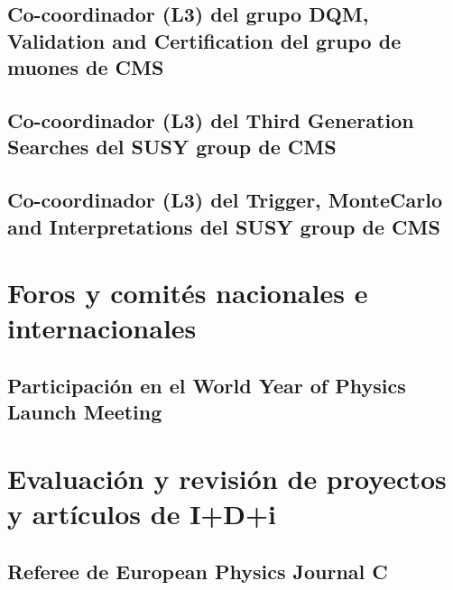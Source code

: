 \documentclass[a4paper, 11pt, twoside, openright]{report}
\begin{document}
\subsection{Co-coordinador (L3) del grupo DQM, Validation and Certification del grupo de muones de CMS}


\subsection{Co-coordinador (L3) del Third Generation Searches del SUSY group de CMS}


\subsection{Co-coordinador (L3) del Trigger, MonteCarlo and Interpretations del SUSY group de CMS}



\section{Foros y comités nacionales e internacionales}

\subsection{Participación en el World Year of Physics Launch Meeting}




\section{Evaluación y revisión de proyectos y artículos de I+D+i}

\subsection{Referee de European Physics Journal C}

\end{document}
